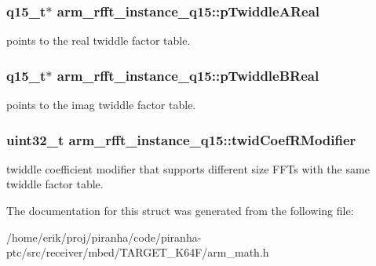 \subsubsection[{\texorpdfstring{p\+Twiddle\+A\+Real}{pTwiddleAReal}}]{\setlength{\rightskip}{0pt plus 5cm}q15\+\_\+t$\ast$ arm\+\_\+rfft\+\_\+instance\+\_\+q15\+::p\+Twiddle\+A\+Real}\hypertarget{structarm__rfft__instance__q15_affbf2de522ac029432d98e8373c0ec53}{}\label{structarm__rfft__instance__q15_affbf2de522ac029432d98e8373c0ec53}
points to the real twiddle factor table. 
\subsubsection[{\texorpdfstring{p\+Twiddle\+B\+Real}{pTwiddleBReal}}]{\setlength{\rightskip}{0pt plus 5cm}q15\+\_\+t$\ast$ arm\+\_\+rfft\+\_\+instance\+\_\+q15\+::p\+Twiddle\+B\+Real}\hypertarget{structarm__rfft__instance__q15_a937d815022adc557b435ba8c6cd58b0d}{}\label{structarm__rfft__instance__q15_a937d815022adc557b435ba8c6cd58b0d}
points to the imag twiddle factor table. 
\subsubsection[{\texorpdfstring{twid\+Coef\+R\+Modifier}{twidCoefRModifier}}]{\setlength{\rightskip}{0pt plus 5cm}uint32\+\_\+t arm\+\_\+rfft\+\_\+instance\+\_\+q15\+::twid\+Coef\+R\+Modifier}\hypertarget{structarm__rfft__instance__q15_afd444d05858c5f419980e94e8240d5c3}{}\label{structarm__rfft__instance__q15_afd444d05858c5f419980e94e8240d5c3}
twiddle coefficient modifier that supports different size F\+F\+Ts with the same twiddle factor table. 

The documentation for this struct was generated from the following file\+:\begin{DoxyCompactItemize}
\item 
/home/erik/proj/piranha/code/piranha-\/ptc/src/receiver/mbed/\+T\+A\+R\+G\+E\+T\+\_\+\+K64\+F/arm\+\_\+math.\+h\end{DoxyCompactItemize}
